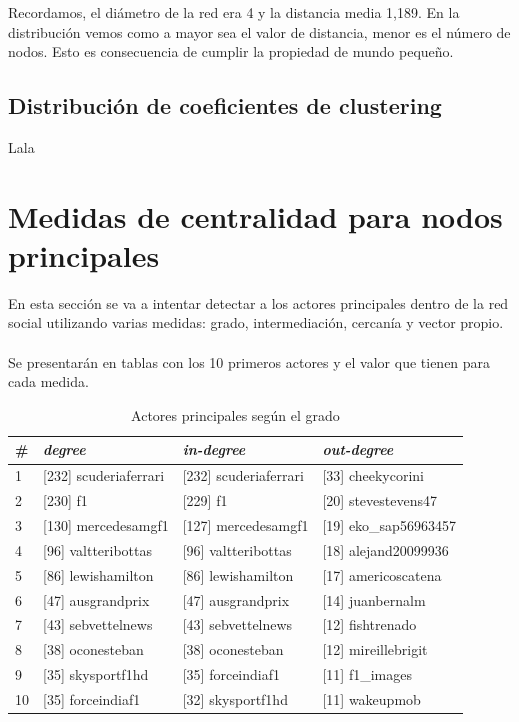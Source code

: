 Recordamos, el diámetro de la red era 4 y la distancia media 1,189. En la distribución vemos como a mayor sea el valor de distancia, menor es el número de nodos. Esto es consecuencia de cumplir la propiedad de mundo pequeño.

\subsection{Distribución de coeficientes de clustering}

Lala

\section{Medidas de centralidad para nodos principales}
\label{sec:hubs}

En esta sección se va a intentar detectar a los actores principales dentro de la red social utilizando varias medidas: grado, intermediación, cercanía y vector propio.
\\ \\
Se presentarán en tablas con los 10 primeros actores y el valor que tienen para cada medida.

\begin{table}[H]
	\centering
	\caption{Actores principales según el grado}
	\label{tab:actores-principales-grado}
	\begin{tabular}{| l | l l l |}
		\hline
		\# & \textit{degree}       & \textit{in-degree}     & \textit{out-degree}   \\
		\hline
		1  & [232] scuderiaferrari & [232] scuderiaferrari  & [33] cheekycorini     \\
		2  & [230] f1              & [229] f1               & [20] stevestevens47   \\
		3  & [130] mercedesamgf1   & [127] mercedesamgf1    & [19] eko\_sap56963457 \\
		4  & [96] valtteribottas   & [96] valtteribottas    & [18] alejand20099936  \\
		5  & [86] lewishamilton    & [86] lewishamilton     & [17] americoscatena   \\
		6  & [47] ausgrandprix     & [47] ausgrandprix      & [14] juanbernalm      \\
		7  & [43] sebvettelnews    & [43] sebvettelnews     & [12] fishtrenado      \\
		8  & [38] oconesteban      & [38] oconesteban       & [12] mireillebrigit   \\
		9  & [35] skysportf1hd     & [35] forceindiaf1      & [11] f1\_images       \\
		10 & [35] forceindiaf1     & [32] skysportf1hd      & [11] wakeupmob        \\
		\hline
	\end{tabular}
\end{table}

